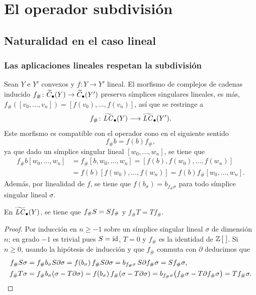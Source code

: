 \section{El operador subdivisión}

\subsection{Naturalidad en el caso lineal}

\begin{frame}[allowframebreaks]
  \frametitle{Las aplicaciones lineales respetan la subdivisión}

  Sean $Y$ e $Y'$ convexos y $f\colon Y\to Y'$ lineal.
  El morfismo de complejos de cadenas inducido $f_\#\colon\widetilde{C}_\bullet(Y)\to\widetilde{C}_\bullet(Y')$ preserva símplices singulares lineales, es más, $f_\#([v_0,\ldots,v_n])=[f(v_0),\ldots,f(v_n)]$, así que se restringe a
  \[
    f_\#\colon\widetilde{\mathit{LC}}_\bullet(Y)\longrightarrow\widetilde{\mathit{LC}}_\bullet(Y').
  \]
  Este morfismo es compatible con el operador cono en el siguiente sentido
  \[f_\#b=f(b)f_\#,\]
  ya que dado un símplice singular lineal $[w_0,\ldots,w_n]$, se tiene que
  \begin{align*}
    f_\#b[w_0,\ldots,w_n]&=f_\#[b,w_0,\ldots,w_n]
      =[f(b),f(w_0),\ldots,f(w_n)]\\
    &=f(b)[f(w_0),\ldots,f(w_n)]
      =f(b)f_\#[w_0,\ldots,w_n].
  \end{align*}
  Además, por linealidad de $f$, se tiene que $f(b_\sigma)=b_{f_\#\sigma}$ para todo símplice singular
  lineal $\sigma$.

  \framebreak

  \begin{lemma}
    En $\widetilde{\mathit{LC}}_\bullet(Y)$, se tiene que $f_\#S=S f_\#$ y $f_\#T=Tf_\#$.
  \end{lemma}

  \begin{proof}
    Por inducción en $n\geq-1$ sobre un símplice singular lineal $\sigma$ de
    dimensión $n$; en grado $-1$ es trivial pues $S=\operatorname{id}$, $T=0$ y $f_\#$ es la identidad de $\mathbb{Z}\,[\;]$. Si $n\geq0$, usando la hipótesis de inducción y que $f_\#$ conmuta con $\partial$ deducimos que
    \begin{align*}
      f_\#S\sigma&=f_\#b_\sigma S\partial\sigma=f(b_\sigma)\,f_\#S\partial\sigma
        =b_{f_\#\sigma}\,S\partial f_\#\sigma=S f_\#\sigma,\\
      f_\#T\sigma&=f_\#b_\sigma(\sigma-T\partial\sigma)=f(b_\sigma)\,f_\#(\sigma-T\partial\sigma)
        =b_{f_\#\sigma}\bigl(f_\#\sigma-T\partial f_\#\sigma\bigr)=Tf_\#\sigma.
    \end{align*}
  \end{proof}
\end{frame}


